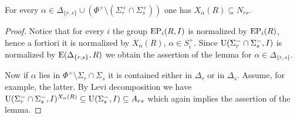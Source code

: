 \begin{lemma}\label{lemma:dv-normal} 
For every $\alpha \in \Delta_{\{r,s\}} \cup (\Phi^+ \setminus (\Sigma^+_r \cap \Sigma^+_s))$ one has $X_\alpha(R) \subseteq N_{rs}$. \end{lemma}
\begin{proof}
Notice that for every $i$ the group $\operatorname{EP}_i(R, I)$ is normalized by $\operatorname{EP}_i(R)$, hence a fortiori it is normalized by $X_\alpha(R)$, $\alpha \in S_i^+$.
Since $\operatorname{U}(\Sigma_r^- \cap \Sigma_s^-, I)$ is normalized by $\operatorname{E}(\Delta_{\{r,s\}}, R)$ we obtain the assertion of the lemma for $\alpha \in \Delta_{\{r, s\}}$.

Now if $\alpha$ lies in $\Phi^+ \setminus \Sigma_r \cap \Sigma_s$ it is contained either in $\Delta_r$ or in $\Delta_s$.
Assume, for example, the latter. By Levi decomposition we have $\operatorname{U}(\Sigma_r^- \cap \Sigma_s^-, I)^{X_\alpha(R)} \subseteq \operatorname{U}(\Sigma_s^-, I) \subseteq A_{rs}$
which again implies the assertion of the lemma.
\end{proof}

